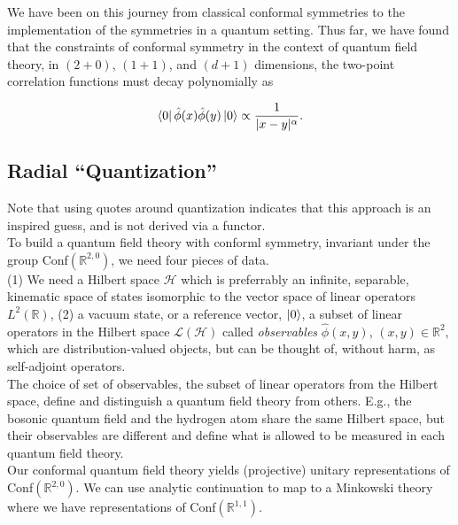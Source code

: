 
\noindent We have been on this journey from classical conformal symmetries to the implementation of the symmetries in a quantum setting. Thus far, we have found that the constraints of conformal symmetry in the context of quantum field theory, in $(2+0)$, $(1+1)$, and $(d+1)$ dimensions, the two-point correlation functions must decay polynomially as

\begin{equation}
\bra{0} \hat{\phi} (x) \hat{\phi} (y) \ket{0} \propto \frac{1}{|x-y|^\alpha}.
\end{equation}

\subsection*{Radial ``Quantization''}

\noindent Note that using quotes around quantization indicates that this approach is an inspired guess, and is not derived via a functor. \\

\noindent To build a quantum field theory with conforml symmetry, invariant under the group Conf$(\mathbb{R}^{2,0})$, we need four pieces of data. \\

\noindent (1) We need a Hilbert space $\mathcal{H}$ which is preferrably an infinite, separable, kinematic space of states isomorphic to the vector space of linear operators $L^2 (\mathbb{R})$, (2) a vacuum state, or a reference vector, $\ket{0}$, a subset of linear operators in the Hilbert space $\mathcal{L}(\mathcal{H})$ called \textit{observables} $\hat{\phi} (x,y)$, $(x,y) \in \mathbb{R}^2$, which are distribution-valued objects, but can be thought of, without harm, as self-adjoint operators. \\

\noindent The choice of set of observables, the subset of linear operators from the Hilbert space, define and distinguish a quantum field theory from others. E.g., the bosonic quantum field and the hydrogen atom share the same Hilbert space, but their observables are different and define what is allowed to be measured in each quantum field theory. \\

\noindent Our conformal quantum field theory yields (projective) unitary representations of Conf$(\mathbb{R}^{2,0})$. We can use analytic continuation to map to a Minkowski theory where we have representations of Conf$(\mathbb{R}^{1,1})$. \\

